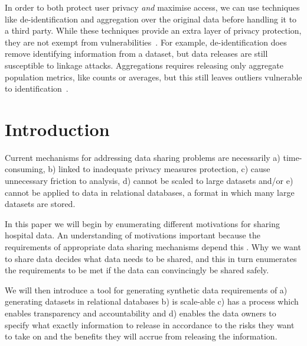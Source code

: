 \documentclass[11pt]{article}
\begin{document}
In order to both protect user privacy \emph{and} maximise access, we can use techniques like de-identification and aggregation over the original data before handling 
it to a third party.
While these techniques provide an extra layer of privacy protection, they are not exempt from vulnerabilities~\cite{near2021}.
For example, de-identification does remove identifying information from a dataset, but data releases are still susceptible to linkage attacks.
Aggregations requires releasing only aggregate population metrics, like counts or averages, but this still leaves outliers vulnerable to identification~\cite{tucker2020}.

\section{Introduction}

Current mechanisms for addressing data sharing problems are necessarily  a) time-consuming, b) linked to inadequate privacy measures protection, c) cause unnecessary friction to analysis, d) cannot be scaled to large datasets and/or e) cannot be applied to data in relational databases, a format in which many large datasets are stored.


In this paper we will begin by enumerating different motivations for sharing hospital data. An understanding of motivations important because the requirements of appropriate data sharing mechanisms depend this . Why we want to share data decides what data needs to be shared, and this in turn enumerates the requirements to be met if the data can convincingly be shared safely. 

We will then introduce a tool for generating synthetic data requirements of a) generating datasets in relational databases b) is scale-able  c) has a process which enables transparency and accountability and d) enables the data owners to specify what exactly information to release in accordance to the risks they want to take on and the benefits they will accrue from releasing the information.
\end{document}
